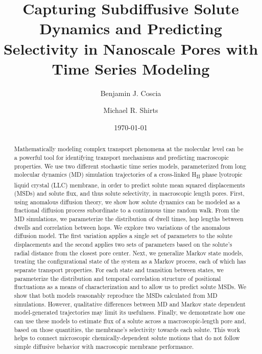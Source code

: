 \documentclass[aps,pre,preprint,groupedaddress,longbibliography]{revtex4-2}
\begin{document}
  
  \title{Capturing Subdiffusive Solute Dynamics and Predicting Selectivity in Nanoscale Pores
  with Time Series Modeling}
  
  \author{Benjamin J. Coscia}
  \author{Michael R. Shirts}
  

  \date{\today}
  
  \begin{abstract}
  
  Mathematically modeling complex transport phenomena at the molecular level 
  can be a powerful tool for identifying transport mechanisms and predicting
  macroscopic properties. We use two different stochastic time series models,
  parameterized from long molecular dynamics (MD) simulation trajectories of
  a cross-linked H\textsubscript{II} phase lyotropic liquid crystal (LLC) 
  membrane, in order to predict solute mean squared displacements (MSDs) 
  and solute flux, and thus solute selectivity, in macroscopic length pores. 
  First, using anomalous diffusion theory, we show how solute dynamics can be
  modeled as a fractional diffusion process subordinate to a continuous time 
  random walk. From the MD simulations, we parameterize the distribution of 
  dwell times, hop lengths between dwells and correlation between hops. We 
  explore two variations of the anomalous diffusion model. The first variation
  applies a single set of parameters to the solute displacements and the second
  applies two sets of parameters based on the solute's radial distance from the
    closest pore center. Next, we generalize Markov state models, treating the
  configurational state of the system as a Markov process, each
  of which has separate transport properties. For each state and transition
  between states, we parameterize the distribution and temporal correlation 
  structure of positional fluctuations as a means of characterization and to 
  allow us to predict solute MSDs. We show that both models reasonably reproduce
  the MSDs calculated from MD simulations. However, qualitative differences 
  between MD and Markov state dependent model-generated trajectories may limit 
  its usefulness. Finally, we demonstrate how one can use these models to 
  estimate flux of a solute across a macroscopic-length pore and, based on 
  those quantities, the membrane's selectivity towards each solute. This work 
  helps to connect microscopic chemically-dependent solute motions that do not
  follow simple diffusive behavior with macroscopic membrane performance.

  \end{abstract}
\end{document}
